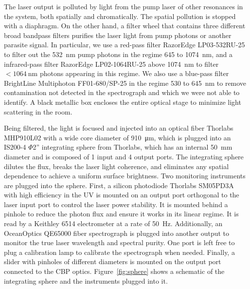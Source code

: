 The laser output is polluted by light from the pump laser of other resonances in the system, both spatially and chromatically. The spatial pollution is stopped with a diaphragm. On the other hand, a filter wheel that contains three different broad bandpass filters purifies the laser light from pump photons or another parasite signal. In particular, we use a red-pass filter RazorEdge LP03-532RU-25 to filter out the \SI{532}{\nano\meter} pump photons in the regime 645 to \SI{1074}{\nano\meter}, and a infrared-pass filter RazorEdge LP02-1064RU-25 above \SI{1074}{\nano\meter} to filter $<\SI{1064}{\nano\meter}$ photons appearing in this regime. We also use a blue-pass filter BrightLine Multiphoton FF01-680/SP-25 in the regime 530 to \SI{645}{\nano\meter} to remove contamination not detected in the spectrograph and which we were not able to identify. A black metallic box encloses the entire optical stage to minimize light scattering in the room.

Being filtered, the light is focused and injected into an optical fiber Thorlabs MHP910L02 with a wide core diameter of \SI{910}{\micro\meter}, which is plugged into an IS200-4 $\Phi$2'' integrating sphere from Thorlabs, which has an internal \SI{50}{\mm} diameter and is composed of 1 input and 4 output ports. The integrating sphere dilutes the flux, breaks the laser light coherence, and eliminates any spatial dependence to achieve a uniform surface brightness. Two monitoring instruments are plugged into the sphere. First, a silicon photodiode Thorlabs SM05PD3A with high efficiency in the UV is mounted on an output port orthogonal to the laser input port to control the laser power stability. It is mounted behind a pinhole to reduce the photon flux and ensure it works in its linear regime. It is read by a Keithley 6514 electrometer at a rate of \SI{50}{\hertz}. Additionally, an OceanOptics QE65000 fiber spectrograph is plugged into another output to monitor the true laser wavelength and spectral purity. One port is left free to plug a calibration lamp to calibrate the spectrograph when needed. Finally, a slider with pinholes of different diameters is mounted on the output port connected to the CBP optics. Figure~\ref{fig:sphere} shows a schematic of the integrating sphere and the instruments plugged into it.

